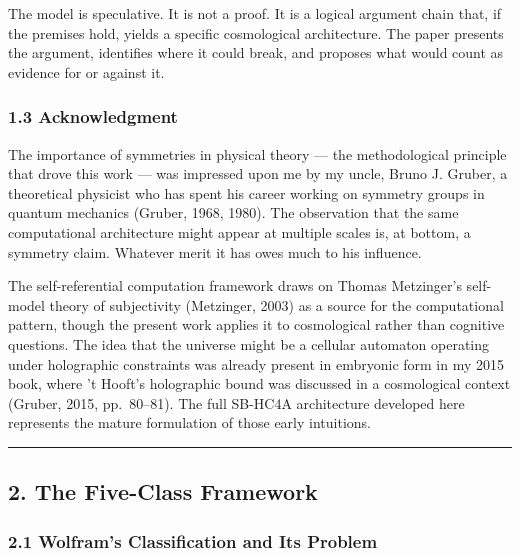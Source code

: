\documentclass[
]{article}
\begin{document}
The model is speculative. It is not a proof. It is a logical argument
chain that, if the premises hold, yields a specific cosmological
architecture. The paper presents the argument, identifies where it could
break, and proposes what would count as evidence for or against it.

\hypertarget{acknowledgment}{%
\subsubsection{1.3 Acknowledgment}\label{acknowledgment}}

The importance of symmetries in physical theory --- the methodological
principle that drove this work --- was impressed upon me by my uncle,
Bruno J. Gruber, a theoretical physicist who has spent his career
working on symmetry groups in quantum mechanics (Gruber, 1968, 1980).
The observation that the same computational architecture might appear at
multiple scales is, at bottom, a symmetry claim. Whatever merit it has
owes much to his influence.

The self-referential computation framework draws on Thomas Metzinger's
self-model theory of subjectivity (Metzinger, 2003) as a source for the
computational pattern, though the present work applies it to
cosmological rather than cognitive questions. The idea that the universe
might be a cellular automaton operating under holographic constraints
was already present in embryonic form in my 2015 book, where 't Hooft's
holographic bound was discussed in a cosmological context (Gruber, 2015,
pp.~80--81). The full SB-HC4A architecture developed here represents the
mature formulation of those early intuitions.

\begin{center}\rule{0.5\linewidth}{0.5pt}\end{center}

\hypertarget{the-five-class-framework}{%
\subsection{2. The Five-Class
Framework}\label{the-five-class-framework}}

\hypertarget{wolframs-classification-and-its-problem}{%
\subsubsection{2.1 Wolfram's Classification and Its
Problem}\label{wolframs-classification-and-its-problem}}
\end{document}
